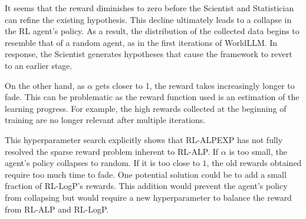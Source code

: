 \documentclass{article}
\begin{document}
It seems that the reward diminishes to zero before the Scientist and Statistician can refine the existing hypothesis. This decline ultimately leads to a collapse in the RL agent's policy. As a result, the distribution of the collected data begins to resemble that of a random agent, as in the first iterations of WorldLLM. In response, the Scientist generates hypotheses that cause the framework to revert to an earlier stage. 

On the other hand, as $\alpha$ gets closer to 1, the reward takes increasingly longer to fade. This can be problematic as the reward function used is an estimation of the learning progress. For example, the high rewards collected at the beginning of training are no longer relevant after multiple iterations. 

This hyperparameter search explicitly shows that RL-ALPEXP has not fully resolved the sparse reward problem inherent to RL-ALP. If $\alpha$ is too small, the agent's policy collapses to random. If it is too close to $1$, the old rewards obtained require too much time to fade. 
One potential solution could be to add a small fraction of RL-LogP's rewards. This addition would prevent the agent's policy from collapsing but would require a new hyperparameter to balance the reward from RL-ALP and RL-LogP.
\end{document}
